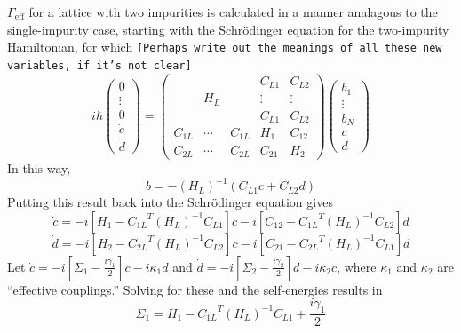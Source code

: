 \documentclass[aps,pra,superscriptaddress,twocolumn]{revtex4-1}
\newcommand{\commentSB}[1]{\texttt{\color{blue}[#1]}}
\begin{document}
$\Gamma_\text{eff}$ for a lattice with two impurities is calculated in a manner analagous to the single-impurity case, starting with the Schr\"odinger equation for the two-impurity Hamiltonian, for which  
\commentSB{Perhaps write out the meanings of all these new variables, if it's not clear}
\begin{equation}
    i \hbar \begin{pmatrix}
        0 \\ \vdots \\ 0 \\ \dot{c} \\ \dot{d}
    \end{pmatrix}
    = \begin{pmatrix}
        ~ & ~ & ~ &   C_{L1} & C_{L2} \\ 
        ~ & H_L & ~ & \vdots & \vdots \\
        ~ & ~ & ~ & C_{L1} &  C_{L2} \\
        C_{1L} & \cdots & C_{1L} & H_1 & C_{12} \\
        C_{2L} & \cdots & C_{2L} & C_{21} & H_2  
    \end{pmatrix} 
    \begin{pmatrix}
        b_1 \\ \vdots \\ b_N \\ c \\ d
    \end{pmatrix}
    \label{eqn:blockH2}
\end{equation}
In this way, 
\begin{equation}
    b = -(H_L)^{-1} (C_{L1} c + C_{L2} d)
\end{equation}
Putting this result back into the Schr\"odinger equation gives 
\begin{equation}
    \dot{c} = -i \left[  H_1 - {C_{1L}}^T (H_L)^{-1} C_{L1}\right] c - i \left[  C_{12} - {C_{1L}}^T (H_L)^{-1} C_{L2} \right] d
\end{equation}
\begin{equation}
    \dot{d} = -i \left[  H_2 - {C_{2L}}^T (H_L)^{-1} C_{L2}\right] c - i \left[  C_{21} - {C_{2L}}^T (H_L)^{-1} C_{L1} \right] d 
\end{equation}
Let $\dot{c} = -i [\Sigma_1 - \frac{i \gamma_1}{2}]c - i \kappa_1 d $ and $\dot{d} = -i [ \Sigma_2 - \frac{i \gamma_2}{2} ] d - i \kappa_2 c $, where $\kappa_1$ and $\kappa_2$ are ``effective couplings.'' Solving for these and the self-energies results in 
\begin{equation}
    \Sigma_1 = H_1 - {C_{1L}}^T (H_L)^{-1} C_{L1} + \frac{i \gamma_1}{2}
\end{equation}
\end{document}
